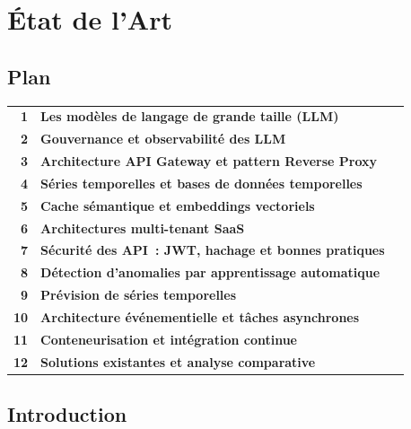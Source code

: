 
\chapter{État de l'Art}

\section*{Plan}

\begin{tabular}{r l r}
\textbf{1} & \textbf{Les modèles de langage de grande taille (LLM)} & \textbf{\pageref{sec:llm}} \\
\textbf{2} & \textbf{Gouvernance et observabilité des LLM} & \textbf{\pageref{sec:gouvernance}} \\
\textbf{3} & \textbf{Architecture API Gateway et pattern Reverse Proxy} & \textbf{\pageref{sec:apigateway}} \\
\textbf{4} & \textbf{Séries temporelles et bases de données temporelles} & \textbf{\pageref{sec:timeseries}} \\
\textbf{5} & \textbf{Cache sémantique et embeddings vectoriels} & \textbf{\pageref{sec:embeddings}} \\
\textbf{6} & \textbf{Architectures multi-tenant SaaS} & \textbf{\pageref{sec:multitenant}} \\
\textbf{7} & \textbf{Sécurité des API~: JWT, hachage et bonnes pratiques} & \textbf{\pageref{sec:securite}} \\
\textbf{8} & \textbf{Détection d'anomalies par apprentissage automatique} & \textbf{\pageref{sec:anomaly}} \\
\textbf{9} & \textbf{Prévision de séries temporelles} & \textbf{\pageref{sec:forecasting}} \\
\textbf{10} & \textbf{Architecture événementielle et tâches asynchrones} & \textbf{\pageref{sec:eventdriven}} \\
\textbf{11} & \textbf{Conteneurisation et intégration continue} & \textbf{\pageref{sec:conteneurisation}} \\
\textbf{12} & \textbf{Solutions existantes et analyse comparative} & \textbf{\pageref{sec:comparatif}} \\
\end{tabular}

\section*{Introduction}

